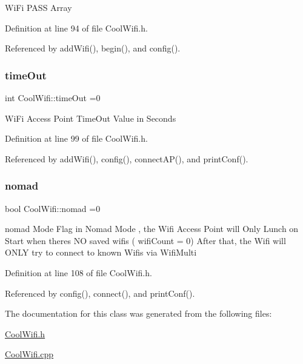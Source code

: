 Wi\+Fi P\+A\+SS Array 

Definition at line 94 of file Cool\+Wifi.\+h.



Referenced by add\+Wifi(), begin(), and config().

\mbox{\label{class_cool_wifi_a952111605f25156588b5632caaba1c6f}} 
\subsubsection{\texorpdfstring{time\+Out}{timeOut}}
{\footnotesize\ttfamily int Cool\+Wifi\+::time\+Out =0\hspace{0.3cm}{\ttfamily [private]}}

Wi\+Fi Access Point Time\+Out Value in Seconds 

Definition at line 99 of file Cool\+Wifi.\+h.



Referenced by add\+Wifi(), config(), connect\+A\+P(), and print\+Conf().

\mbox{\label{class_cool_wifi_ab7d9643c4af7bac3be331ef008b2ea27}} 
\subsubsection{\texorpdfstring{nomad}{nomad}}
{\footnotesize\ttfamily bool Cool\+Wifi\+::nomad =0\hspace{0.3cm}{\ttfamily [private]}}

nomad Mode Flag in Nomad Mode , the Wifi Access Point will Only Lunch on Start when there\textquotesingle{}s NO saved wifis ( wifi\+Count = 0) After that, the Wifi will O\+N\+LY try to connect to known Wifis via Wifi\+Multi 

Definition at line 108 of file Cool\+Wifi.\+h.



Referenced by config(), connect(), and print\+Conf().



The documentation for this class was generated from the following files\+:\begin{DoxyCompactItemize}
\item 
\hyperlink{_cool_wifi_8h}{Cool\+Wifi.\+h}\item 
\hyperlink{_cool_wifi_8cpp}{Cool\+Wifi.\+cpp}\end{DoxyCompactItemize}
